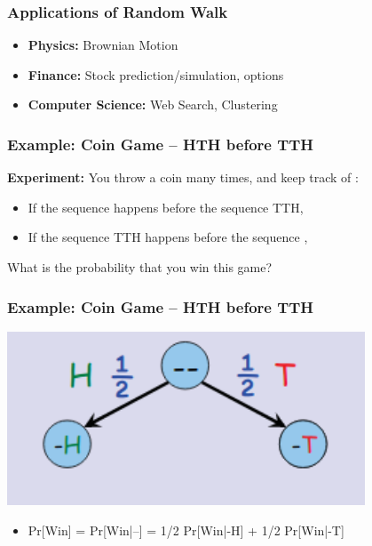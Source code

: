 \documentclass{beamer}
\begin{document}
\begin{frame}
  \frametitle{Applications of Random Walk}

  {\larger
    \begin{itemize}
    \item {\bf Physics:} Brownian Motion
      \bigskip
      
    \item {\bf Finance:} Stock prediction/simulation, options
      \bigskip

    \item {\bf Computer Science:} Web Search, Clustering
    \end{itemize}
  }
\end{frame}

\begin{frame}
  \frametitle{Example: Coin Game -- HTH before TTH}


  {\larger
    
    {\bf Experiment:} You throw a coin many times, and keep track of
    :

    \vfill

    \begin{itemize}
    \item If the sequence  happens before the sequence
      \alert{TTH}, 
      \bigskip

    \item If the sequence \alert{TTH} happens before the sequence
      , 
    \end{itemize}
    

    \bigskip

    What is the probability that you win this game?

  }
\end{frame}

\begin{frame}
  \frametitle{Example: Coin Game -- HTH before TTH}
  \begin{center}
    \includegraphics[width=0.8\textwidth]{../img/hth_1}
  \end{center}

  {\larger
    \begin{itemize}
    \item Pr[Win] = Pr[Win|--] = 1/2 Pr[Win|-H] + 1/2 Pr[Win|-T]
    \end{itemize}
  }
\end{frame}
\end{document}
